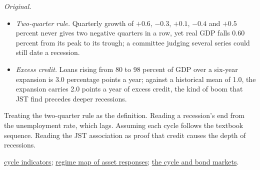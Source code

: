 \begin{qfdefinition}
 \emph{Original.}
\begin{itemize}
\item \emph{Two-quarter rule.} Quarterly growth of $+0.6$, $-0.3$, $+0.1$, $-0.4$ and $+0.5$ percent never gives two negative quarters in a row, yet real GDP falls 0.60 percent from its peak to its trough; a committee judging several series could still date a recession.
\item \emph{Excess credit.} Loans rising from 80 to 98 percent of GDP over a six-year expansion is 3.0 percentage points a year; against a historical mean of 1.0, the expansion carries 2.0 points a year of excess credit, the kind of boom that JST find precedes deeper recessions.
\end{itemize}

 Treating the two-quarter rule as the definition. Reading a recession's end from the unemployment rate, which lags. Assuming each cycle follows the textbook sequence. Reading the JST association as proof that credit causes the depth of recessions.

 \hyperref[meth:business-cycle-indicators]{cycle indicators}; \hyperref[def:macro-regime-asset-map]{regime map of asset responses}; \hyperref[meth:cycle-rates-breakevens-spreads]{the cycle and bond markets}.

\end{qfdefinition}

